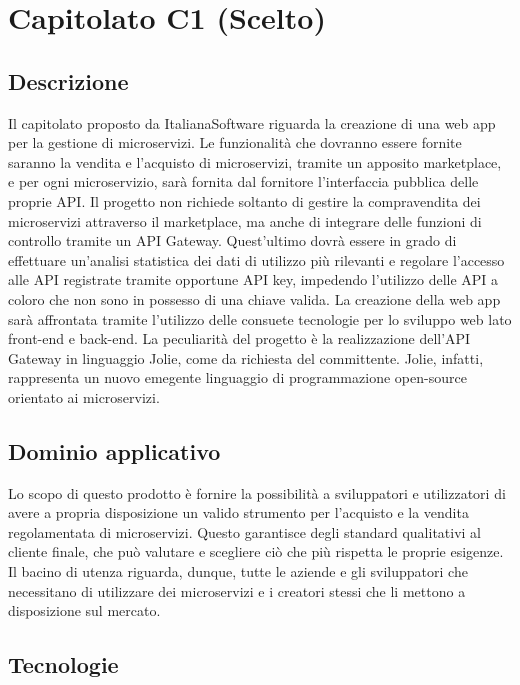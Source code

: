 \newpage
\section{Capitolato C1 (Scelto)}

\subsection{Descrizione}

Il capitolato proposto da ItalianaSoftware riguarda la creazione di
una web app per la gestione di microservizi. Le funzionalità che dovranno essere fornite saranno la vendita e l'acquisto di microservizi, tramite un apposito marketplace, e per ogni microservizio, sarà fornita dal fornitore l'interfaccia pubblica delle proprie API. Il progetto non richiede soltanto di gestire la compravendita dei microservizi attraverso il marketplace, ma anche di integrare delle funzioni di controllo tramite un API Gateway.
Quest'ultimo dovrà essere in grado di effettuare un'analisi statistica dei dati di utilizzo più rilevanti e regolare l'accesso alle API registrate
tramite opportune API key, impedendo l'utilizzo delle API a coloro che
non sono in possesso di una chiave valida. La creazione della web
app sarà affrontata tramite l'utilizzo delle consuete tecnologie per
lo sviluppo web lato front-end e back-end. La peculiarità del progetto
è la realizzazione dell'API Gateway in linguaggio Jolie, come da richiesta
del committente. Jolie, infatti, rappresenta un nuovo emegente linguaggio
di programmazione open-source orientato ai microservizi.

\subsection{Dominio applicativo}

Lo scopo di questo prodotto è fornire la possibilità a sviluppatori
e utilizzatori di avere a propria disposizione un valido strumento
per l'acquisto e la vendita regolamentata di microservizi. Questo
garantisce degli standard qualitativi al cliente finale, che
può valutare e scegliere ciò che più rispetta le proprie esigenze.
Il bacino di utenza riguarda, dunque, tutte le aziende e gli sviluppatori
che necessitano di utilizzare dei microservizi e i creatori stessi che li mettono a disposizione sul mercato.

\subsection{Tecnologie}

